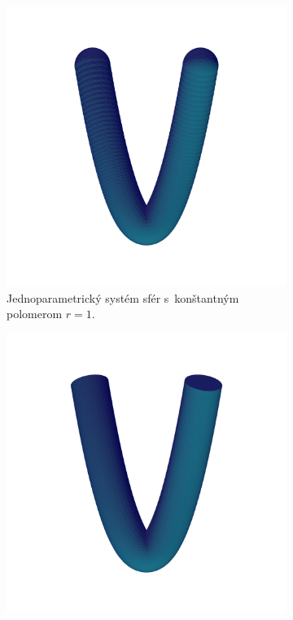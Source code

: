\documentclass[12pt, twoside]{book}
\begin{document}
\begin{figure}[h]
    \centering
    \captionsetup{justification=centering}
    \captionsetup[subfigure]{justification=centering}
    \begin{subfigure}[t]{0.49\textwidth}
        \centering
        \includegraphics[width=\textwidth, trim=0mm 50mm 0mm 80mm, clip=true]{images/bienert_constant_radius_spheres.png}
        	\caption{Jednoparametrický systém sfér s~konštantným polomerom $r=1$.}
        \label{fig:plocha1}
    \end{subfigure}
    \begin{subfigure}[t]{0.49\textwidth}
        \centering
        \includegraphics[width=\textwidth, trim=0mm 50mm 0mm 80mm, clip=true]{images/bienert_constant_radius_envelope.png}

\end{subfigure}
\end{figure}
\end{document}
